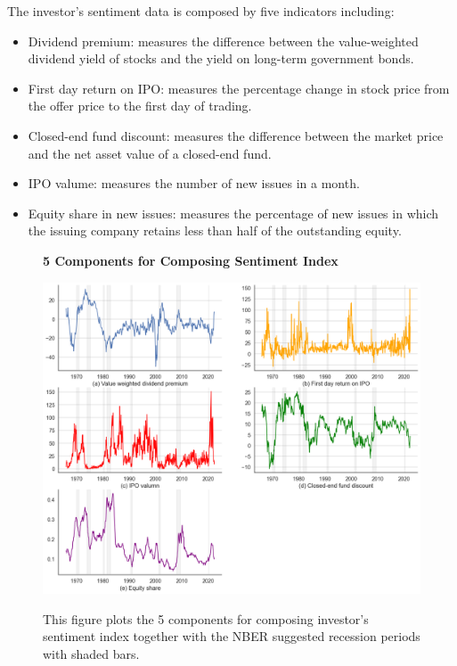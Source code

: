The investor's sentiment data is composed by five indicators including:

\begin{itemize}
  \item Dividend premium: measures the difference between the value-weighted dividend yield of stocks and the yield on long-term government bonds.
  \item First day return on IPO: measures the percentage change in stock price from the offer price to the first day of trading.
  \item Closed-end fund discount: measures the difference between the market price and the net asset value of a closed-end fund.
  \item IPO valume: measures the number of new issues in a month.
  \item Equity share in new issues: measures the percentage of new issues in which the issuing company retains less than half of the outstanding equity.
\end{itemize}

\begin{figure}[H]
  \centering
  \caption{\textbf{5 Components for Composing Sentiment Index}}
  \includegraphics[width=.8\textwidth]{images/sent_5_components.png}
  \label{fig: 5 components for sentiment}
  \caption*{\footnotesize{This figure plots the 5 components for composing investor's sentiment index together with the NBER suggested recession periods with shaded bars.}}
\end{figure} 